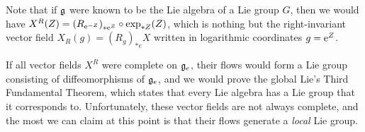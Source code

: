 \begin{rem}
    Note that if $\mathfrak{g}$ were known to be the Lie algebra of a Lie group $G$, then we would have $X^R(Z)=\left(R_{\mathrm{e}^{-Z}}\right)_{\ast \mathrm{e}^Z} \circ \exp_{\ast Z}(Z)$, which is nothing but the right-invariant vector field $X_R(g)=\left(R_g\right)_{\ast e} X$ written in logarithmic coordinates $g=\mathrm{e}^Z$.

    If all vector fields $X^R$ were complete on $\mathfrak{g}_e$, their flows would form a Lie group consisting of diffeomorphisms of $\mathfrak{g}_e$, and we would prove the global Lie's Third Fundamental Theorem, which states that every Lie algebra has a Lie group that it corresponds to. Unfortunately, these vector fields are not always complete, and the most we can claim at this point is that their flows generate a \emph{local} Lie group.
\end{rem}


